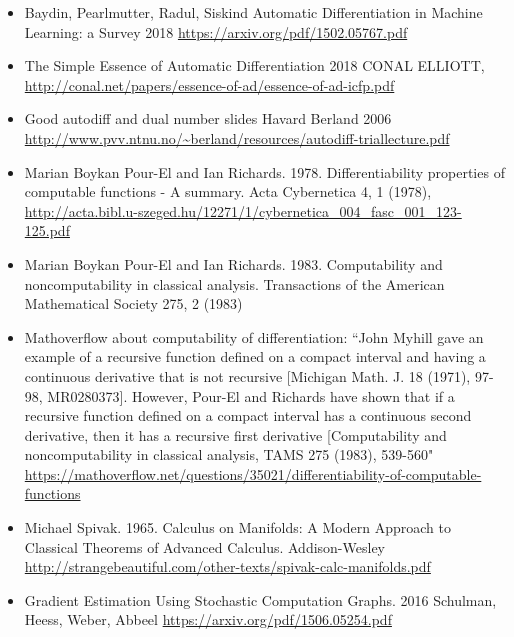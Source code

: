 \documentclass[11pt]{article}
\theoremstyle{definition}
\theoremstyle{plain}
\begin{document}
\begin{itemize}
    
    \item  Baydin, Pearlmutter, Radul, Siskind
    Automatic Differentiation
    in Machine Learning: a Survey 2018
    \url{https://arxiv.org/pdf/1502.05767.pdf}

    \item The Simple Essence of Automatic Differentiation 2018
    CONAL ELLIOTT, \url{http://conal.net/papers/essence-of-ad/essence-of-ad-icfp.pdf}

    \item Good autodiff and dual number slides
    Havard Berland 2006
    \url{http://www.pvv.ntnu.no/~berland/resources/autodiff-triallecture.pdf}

    \item Marian Boykan Pour-El and Ian Richards. 1978. 
    Differentiability properties of computable functions - A summary. 
    Acta Cybernetica 4, 1 (1978), 
    \url{http://acta.bibl.u-szeged.hu/12271/1/cybernetica\_004\_fasc\_001\_123-125.pdf}

    \item Marian Boykan Pour-El and Ian Richards. 1983. 
    Computability and noncomputability in classical analysis. Transactions of
    the American Mathematical Society 275, 2 (1983)

    \item Mathoverflow about computability of differentiation: 
    ``John Myhill gave an example of a recursive function defined on a 
    compact interval and having a continuous derivative that is not recursive 
    [Michigan Math. J. 18 (1971), 97-98, MR0280373]. However, Pour-El and Richards 
    have shown that if a recursive function defined on a compact interval has a 
    continuous second derivative, then it has a recursive first derivative 
    [Computability and noncomputability in classical analysis, TAMS 275 (1983), 539-560"
    \url{https://mathoverflow.net/questions/35021/differentiability-of-computable-functions}

    \item Michael Spivak. 1965. Calculus on Manifolds: A Modern Approach to 
    Classical Theorems of Advanced Calculus. Addison-Wesley
    \url{http://strangebeautiful.com/other-texts/spivak-calc-manifolds.pdf}

    \item Gradient Estimation Using Stochastic Computation Graphs. 2016
    Schulman, Heess, Weber, Abbeel
    \url{https://arxiv.org/pdf/1506.05254.pdf}


\end{itemize}
\end{document}
